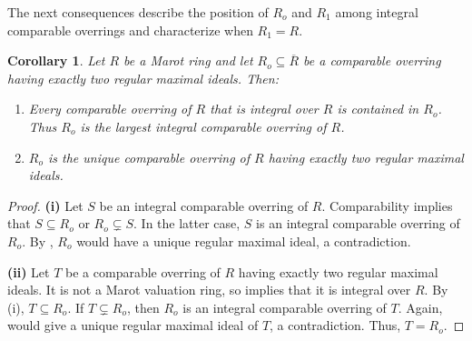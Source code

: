 \documentclass[12pt]{article}
\newtheorem{corollary}{Corollary}
\begin{document}
The next consequences describe the position of $R_o$ and $R_1$ among integral comparable overrings and characterize when $R_1=R$.

\begin{corollary}\label{largest-integral-comparable}
		Let $R$ be a Marot ring and let $R_o\subseteq\overline R$ be a comparable overring having exactly two regular maximal ideals. Then:
		\begin{enumerate}[label=(\roman*)]
			\item Every comparable overring of $R$ that is integral over $R$ is contained in $R_o$. Thus $R_o$ is the largest integral comparable overring of $R$.
			\item $R_o$ is the unique comparable overring of $R$ having exactly two regular maximal ideals.
		\end{enumerate}
	\end{corollary}
	\begin{proof}
		\textbf{(i)} Let $S$ be an integral comparable overring of $R$. Comparability implies that $S\subseteq R_o$ or $R_o\subsetneq S$. In the latter case, $S$ is an integral comparable overring of $R_o$. By \cite[Proposition 3.3]{marot}, $R_o$ would have a unique regular maximal ideal, a contradiction.
		
		\textbf{(ii)} Let $T$ be a comparable overring of $R$ having exactly two regular maximal ideals. It is not a Marot valuation ring, so \cite[Proposition 3.2]{marot} implies that it is integral over $R$. By (i), $T\subseteq R_o$. If $T\subsetneq R_o$, then $R_o$ is an integral comparable overring of $T$. Again, \cite[Proposition 3.3]{marot} would give a unique regular maximal ideal of $T$, a contradiction. Thus, $T=R_o$.
	\end{proof}
\end{document}
